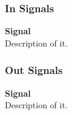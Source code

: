 
\subsubsection{In Signals}

\begin{description}
\item{\textbf{Signal}} \\
Description of it.

\end{description}

\subsubsection{Out Signals}

\begin{description}
\item{\textbf{Signal}} \\
Description of it.
\end{description}
